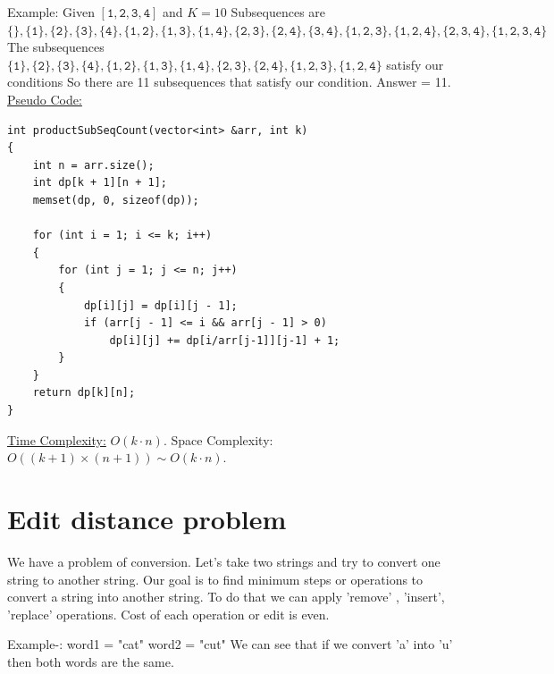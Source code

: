 \documentclass[12pt]{book}
\begin{document}
Example: Given $\mathtt{[1,2,3,4]}$ and $K = 10$\newline
Subsequences are\newline
$\mathtt{\{\},\{1\},\{2\}, \{3\}, \{4\}, \{1, 2\}, \{1, 3\}, \{1, 4\}, \{2, 3\}, \{2, 4\},\{3, 4\}, \{1, 2, 3\}, \{1, 2, 4\}, \{2, 3, 4\}, \{1, 2, 3, 4\}}$\newline
The subsequences 
$\mathtt{\{1\},\{2\}, \{3\}, \{4\}, \{1, 2\}, \{1, 3\}, \{1, 4\}, \{2, 3\}, \{2, 4\}, \{1, 2, 3\}, \{1, 2, 4\}}$ satisfy our conditions\newline
So there are 11 subsequences that satisfy our condition. Answer = 11.\\

\underline{Pseudo Code:}\\

\begin{lstlisting}
int productSubSeqCount(vector<int> &arr, int k)
{
    int n = arr.size();
    int dp[k + 1][n + 1];
    memset(dp, 0, sizeof(dp));
  
    for (int i = 1; i <= k; i++) 
    {
        for (int j = 1; j <= n; j++) 
        {
            dp[i][j] = dp[i][j - 1];
            if (arr[j - 1] <= i && arr[j - 1] > 0) 
                dp[i][j] += dp[i/arr[j-1]][j-1] + 1;
        }
    }
    return dp[k][n];
}
\end{lstlisting}

\underline{Time Complexity:} $O(k \cdot n)$.\newline
Space Complexity: $O((k+1) \times (n+1)) \sim O(k \cdot n)$.\\

\section{Edit distance problem}
We have a problem of conversion. Let's take two strings and try to convert one string to another string. Our goal is to find minimum steps or operations to convert a string into another string.\newline
To do that we can apply 'remove' , 'insert', 'replace' operations. Cost of each operation or edit is even.\newline

Example-:\newline
                word1 = "cat"\newline
                word2 = "cut"\newline
We can see that if we convert 'a' into 'u' then both words are the same.\newline
\end{document}

